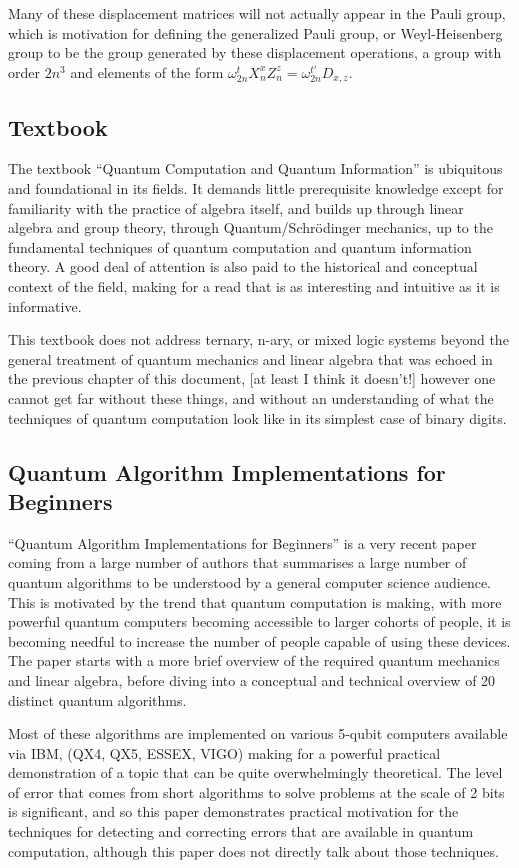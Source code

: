 \documentclass[]{article}
\begin{document}
Many of these displacement matrices will not actually appear in the Pauli group, which is motivation for defining the generalized Pauli group, or Weyl-Heisenberg group to be the group generated by these displacement operations, a group with order $2n^3$ and elements of the form $\omega_{2n}^tX_n^xZ_n^z = \omega_{2n}^{t'}D_{x, z}$.


\subsection{Textbook}
The textbook ``Quantum Computation and Quantum Information''\cite{textbook} is ubiquitous and foundational in its fields. It demands little prerequisite knowledge except for familiarity with the practice of algebra itself, and builds up through linear algebra and group theory, through Quantum/Schrödinger mechanics, up to the fundamental techniques of quantum computation and quantum information theory. A good deal of attention is also paid to the historical and conceptual context of the field, making for a read that is as interesting and intuitive as it is informative.

This textbook does not address ternary, n-ary, or mixed logic systems beyond the general treatment of quantum mechanics and linear algebra that was echoed in the previous chapter of this document, [at least I think it doesn't!] however one cannot get far without these things, and without an understanding of what the techniques of quantum computation look like in its simplest case of binary digits.

\subsection{Quantum Algorithm Implementations for Beginners}
``Quantum Algorithm Implementations for Beginners''\cite{algos} is a very recent paper coming from a large number of authors that summarises a large number of quantum algorithms to be understood by a general computer science audience. This is motivated by the trend that quantum computation is making, with more powerful quantum computers becoming accessible to larger cohorts of people, it is becoming needful to increase the number of people capable of using these devices. The paper starts with a more brief overview of the required quantum mechanics and linear algebra, before diving into a conceptual and technical overview of 20 distinct quantum algorithms.

Most of these algorithms are implemented on various 5-qubit computers available via IBM, (QX4, QX5, ESSEX, VIGO) making for a powerful practical demonstration of a topic that can be quite overwhelmingly theoretical. The level of error that comes from short algorithms to solve problems at the scale of 2 bits is significant, and so this paper demonstrates practical motivation for the techniques for detecting and correcting errors that are available in quantum computation, although this paper does not directly talk about those techniques.
\end{document}
